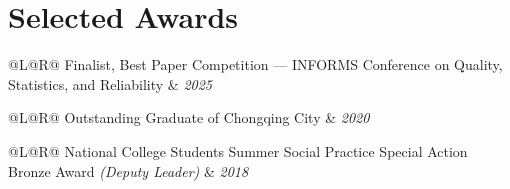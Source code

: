 \documentclass[11pt, a4paper]{article}
\makeatletter
\newcommand{\edentry}[4]{%
  \begin{tabularx}{\textwidth}{@{}L@{\hspace{6pt}}R@{}}
    \textbf{#1} & \textit{\small #2} \\
  \end{tabularx}\par
  \textit{\small #3}\par
  \vspace{1pt}
  {\small\textit{Research: }#4}
  \vspace{3pt}
}
\newcommand{\awardentry}[2]{%
  \begin{tabularx}{\textwidth}{@{}L@{\hspace{6pt}}R@{}}
    #1 & \textit{\small #2} \\
  \end{tabularx}%
  \vspace{1pt}
}
\makeatother
\begin{document}
\section{Selected Awards}

\awardentry{Finalist, Best Paper Competition — INFORMS Conference on Quality, Statistics,
  and Reliability}{2025}

\awardentry{Outstanding Graduate of Chongqing City}{2020}

\awardentry{National College Students Summer Social Practice Special Action
  Bronze Award \textit{(Deputy Leader)}}{2018}




\end{document}
